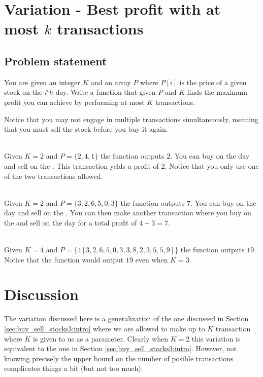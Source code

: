 \section{Variation - Best profit with at most $k$ transactions}
\label{sec:buy_sell_stocks4:intro}

\subsection{Problem statement}
\begin{exercise}
    You are given an integer $K$ and an array $P$ where $P[i]$ is the price of a given stock on the $i^th$ day.
    Write a function that given $P$ and $K$ finds the maximum profit you can achieve by performing at most $K$ transactions.
    
    Notice that you may not engage in multiple transactions simultaneously, meaning that you must sell the stock before you buy it again.

    \begin{example}
    \label{ex:buy_sell_stocks4:exmaple1}
        \hfill \\
        Given $K=2$ and $P=\{2,4,1\}$ the function outputs $2$. 
        You can buy on the  day and sell on the . This transaction yelds a profit of $2$. Notice that you only use one of the two transactions allowed.
    \end{example}

    \begin{example}
        \label{ex:buy_sell_stocks4:exmaple2}
            \hfill \\
            Given $K=2$ and $P=\{3,2,6,5,0,3\}$ the function outputs $7$. 
            You can buy on the  day and sell on the . You can then make another transaction where you buy on the  and sell on the  day for a total profit of $4+3=7$.
    \end{example}

    \begin{example}
        \label{ex:buy_sell_stocks4:exmaple3}
            \hfill \\
            Given $K=4$ and $P=\{4
            [3,2,6,5,0,3,3,8,2,3,5,5,9]\}$ the function outputs $19$. 
            Notice that the function would output $19$ even when $K=3$.
    \end{example}
\end{exercise}


\section{Discussion}
\label{buy_sell_stocks4:sec:discussion}
The variation discussed here is a generalization of the one discussed in Section \ref{sec:buy_sell_stocks3:intro} where we are allowed to make up to $K$ transaction where $K$ is given to us as a parameter.
Clearly when $K=2$ this variation is equivalent to the one in Section \ref{sec:buy_sell_stocks3:intro}. 
However, not knowing precisely the upper bound on the number of posible transactions complicates things a bit (but not too much).

